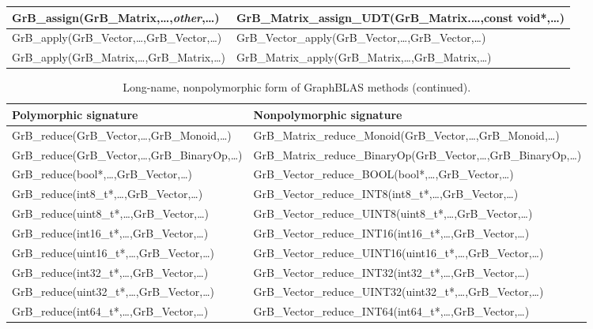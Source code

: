 \begin{table}[htb]
{\begin{tabular}{l|l}
{\sf GrB\_assign(GrB\_Matrix,\ldots,\emph{other},\ldots)}	& {\sf GrB\_Matrix\_assign\_UDT(GrB\_Matrix.\ldots,const void*,\ldots)} \\ \hline
{\sf GrB\_apply(GrB\_Vector,\ldots,GrB\_Vector,\ldots)}		& {\sf GrB\_Vector\_apply(GrB\_Vector,\ldots,GrB\_Vector,\ldots)} \\
{\sf GrB\_apply(GrB\_Matrix,\ldots,GrB\_Matrix,\ldots)}		& {\sf GrB\_Matrix\_apply(GrB\_Matrix,\ldots,GrB\_Matrix,\ldots)} \\ \hline
\end{tabular}
}
\label{Tab:NonPolymorphic5}
\end{table}

\begin{table}[htb]
\caption{Long-name, nonpolymorphic form of GraphBLAS methods (continued).}
{\footnotesize
\begin{tabular}{l|l}
Polymorphic signature	& Nonpolymorphic signature  \\ \hline
{\sf GrB\_reduce(GrB\_Vector,\ldots,GrB\_Monoid,\ldots)} 	& {\sf GrB\_Matrix\_reduce\_Monoid(GrB\_Vector,\ldots,GrB\_Monoid,\ldots)} \\
{\sf GrB\_reduce(GrB\_Vector,\ldots,GrB\_BinaryOp,\ldots)} 	& {\sf GrB\_Matrix\_reduce\_BinaryOp(GrB\_Vector,\ldots,GrB\_BinaryOp,\ldots)} \\ \hline
{\sf GrB\_reduce(bool*,\ldots,GrB\_Vector,\ldots)}		& {\sf GrB\_Vector\_reduce\_BOOL(bool*,\ldots,GrB\_Vector,\ldots)} \\
{\sf GrB\_reduce(int8\_t*,\ldots,GrB\_Vector,\ldots)}		& {\sf GrB\_Vector\_reduce\_INT8(int8\_t*,\ldots,GrB\_Vector,\ldots)} \\
{\sf GrB\_reduce(uint8\_t*,\ldots,GrB\_Vector,\ldots)}		& {\sf GrB\_Vector\_reduce\_UINT8(uint8\_t*,\ldots,GrB\_Vector,\ldots)} \\
{\sf GrB\_reduce(int16\_t*,\ldots,GrB\_Vector,\ldots)}		& {\sf GrB\_Vector\_reduce\_INT16(int16\_t*,\ldots,GrB\_Vector,\ldots)} \\
{\sf GrB\_reduce(uint16\_t*,\ldots,GrB\_Vector,\ldots)}		& {\sf GrB\_Vector\_reduce\_UINT16(uint16\_t*,\ldots,GrB\_Vector,\ldots)} \\
{\sf GrB\_reduce(int32\_t*,\ldots,GrB\_Vector,\ldots)}		& {\sf GrB\_Vector\_reduce\_INT32(int32\_t*,\ldots,GrB\_Vector,\ldots)} \\
{\sf GrB\_reduce(uint32\_t*,\ldots,GrB\_Vector,\ldots)}		& {\sf GrB\_Vector\_reduce\_UINT32(uint32\_t*,\ldots,GrB\_Vector,\ldots)} \\
{\sf GrB\_reduce(int64\_t*,\ldots,GrB\_Vector,\ldots)}		& {\sf GrB\_Vector\_reduce\_INT64(int64\_t*,\ldots,GrB\_Vector,\ldots)} \\

\end{tabular}}
\end{table}

